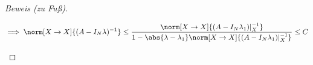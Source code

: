 \begin{proof}[Beweis (zu Fuß)]
\begin{enumerate}[label = (\roman*)]
        \begin{align*}
            \implies
            \norm[X \to X]{(A - I_N \lambda)^{-1}}
            \leq
            \frac
            {
                \norm[X \to X]{(A - I_N \lambda_1) |_X^{-1}}
            }{
                1
                -
                \abs{\lambda - \lambda_1}
                \norm[X \to X]{(A - I_N \lambda_1) |_X^{-1}}
            }
            \leq
            C
        \end{align*}

    \end{enumerate}

\end{proof}
